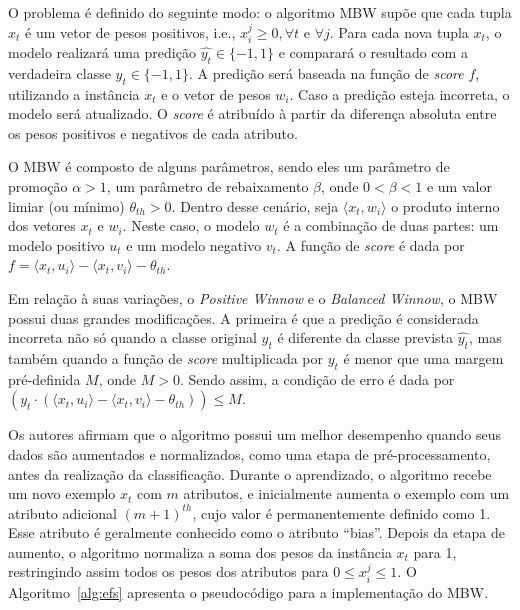 O problema é definido do seguinte modo: o algoritmo MBW supõe que cada tupla $x_t$ é um vetor de pesos positivos, i.e., $x_{i}^{j} \geq 0, \forall t \text{ e } \forall j $. Para cada nova tupla $x_t$, o modelo realizará uma predição $\hat{y_t} \in \{-1,1\}$ e comparará o resultado com a verdadeira classe $y_t \in \{-1,1\}$. A predição será baseada na função de \textit{score} $f$, utilizando a instância $x_t$ e o vetor de pesos $w_i$. Caso a predição esteja incorreta, o modelo será atualizado. O \textit{score} é atribuído à partir da diferença absoluta entre os pesos positivos e negativos de cada atributo. 

O MBW é composto de alguns parâmetros, sendo eles um parâmetro de promoção $\alpha > 1$, um parâmetro de rebaixamento $\beta$, onde $0 < \beta < 1$ e um valor limiar (ou mínimo) ${\theta}_{th} > 0$. Dentro desse cenário, seja $\langle x_t, w_i \rangle$ o produto interno dos vetores $x_t$ e $w_i$. Neste caso, o modelo $w_t$ é a combinação de duas partes: um modelo positivo $u_t$ e um modelo negativo $v_t$. A função de \textit{score} é dada por $f = \langle x_t, u_i \rangle - \langle x_t, v_i \rangle - {\theta}_{th}$.

Em relação à suas variações, o \textit{Positive Winnow} e o \textit{Balanced Winnow}, o MBW possui duas grandes modificações. A primeira é que a predição é considerada incorreta não só quando a classe original $y_t$ é diferente da classe prevista $\hat{y_t}$, mas também quando a função de  \textit{score} multiplicada por $y_t$ é menor que uma margem pré-definida $M$, onde $M > 0$. Sendo assim, a condição de erro é dada por $(y_t \cdot (\langle x_t,u_i \rangle - \langle x_t, v_i \rangle - {\theta}_{th})) \leq M$.

Os autores afirmam que o algoritmo possui um melhor desempenho quando seus dados são aumentados e normalizados, como uma etapa de pré-processamento, antes da realização da classificação. Durante o aprendizado, o algoritmo recebe um novo exemplo $x_t$ com $m$ atributos, e inicialmente aumenta o exemplo com um atributo adicional $(m+1)^{th}$, cujo valor é permanentemente definido como 1. Esse atributo é geralmente conhecido como o atributo ``bias''. Depois da etapa de aumento, o algoritmo normaliza a soma dos pesos da instância $x_t$ para 1, restringindo assim todos os pesos dos atributos para $0 \leq x_{i}^{j} \leq 1 $. O Algoritmo~\ref{alg:efs} apresenta o pseudocódigo para a implementação do MBW.



